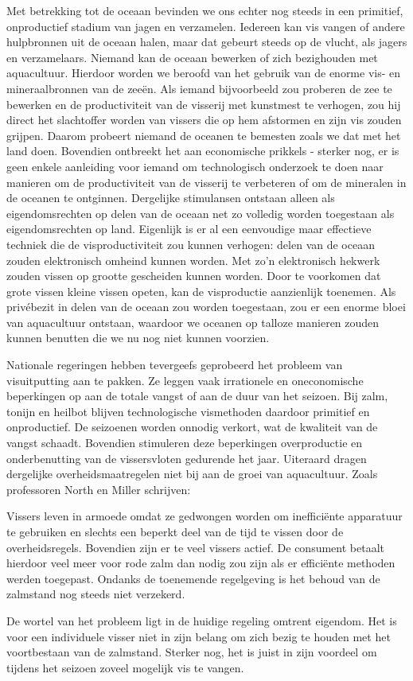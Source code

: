 \documentclass[
  a5paper,
  smalldemyvopaper,10pt,twoside,onecolumn,openright,extrafontsizes,hidelinks]{memoir}
\renewenvironment{quote}%
               {\list{}{\rightmargin=.6cm\leftmargin=.6cm}%
                \itshape \item[]}%
               {\endlist}
\begin{document}
Met betrekking tot de oceaan bevinden we ons echter nog steeds in een
primitief, onproductief stadium van jagen en verzamelen. Iedereen kan
vis vangen of andere hulpbronnen uit de oceaan halen, maar dat gebeurt
steeds op de vlucht, als jagers en verzamelaars. Niemand kan de oceaan
bewerken of zich bezighouden met aquacultuur. Hierdoor worden we beroofd
van het gebruik van de enorme vis- en mineraalbronnen van de zeeën. Als
iemand bijvoorbeeld zou proberen de zee te bewerken en de productiviteit
van de visserij met kunstmest te verhogen, zou hij direct het
slachtoffer worden van vissers die op hem afstormen en zijn vis zouden
grijpen. Daarom probeert niemand de oceanen te bemesten zoals we dat met
het land doen. Bovendien ontbreekt het aan economische prikkels -
sterker nog, er is geen enkele aanleiding voor iemand om technologisch
onderzoek te doen naar manieren om de productiviteit van de visserij te
verbeteren of om de mineralen in de oceanen te ontginnen. Dergelijke
stimulansen ontstaan alleen als eigendomsrechten op delen van de oceaan
net zo volledig worden toegestaan als eigendomsrechten op land.
Eigenlijk is er al een eenvoudige maar effectieve techniek die de
visproductiviteit zou kunnen verhogen: delen van de oceaan zouden
elektronisch omheind kunnen worden. Met zo'n elektronisch hekwerk zouden
vissen op grootte gescheiden kunnen worden. Door te voorkomen dat grote
vissen kleine vissen opeten, kan de visproductie aanzienlijk toenemen.
Als privébezit in delen van de oceaan zou worden toegestaan, zou er een
enorme bloei van aquacultuur ontstaan, waardoor we oceanen op talloze
manieren zouden kunnen benutten die we nu nog niet kunnen voorzien.

Nationale regeringen hebben tevergeefs geprobeerd het probleem van
visuitputting aan te pakken. Ze leggen vaak irrationele en oneconomische
beperkingen op aan de totale vangst of aan de duur van het seizoen. Bij
zalm, tonijn en heilbot blijven technologische vismethoden daardoor
primitief en onproductief. De seizoenen worden onnodig verkort, wat de
kwaliteit van de vangst schaadt. Bovendien stimuleren deze beperkingen
overproductie en onderbenutting van de vissersvloten gedurende het jaar.
Uiteraard dragen dergelijke overheidsmaatregelen niet bij aan de groei
van aquacultuur. Zoals professoren North en Miller schrijven:

\begin{quote}
Vissers leven in armoede omdat ze gedwongen worden om inefficiënte
apparatuur te gebruiken en slechts een beperkt deel van de tijd te
vissen door de overheidsregels. Bovendien zijn er te veel vissers
actief. De consument betaalt hierdoor veel meer voor rode zalm dan nodig
zou zijn als er efficiënte methoden werden toegepast. Ondanks de
toenemende regelgeving is het behoud van de zalmstand nog steeds niet
verzekerd.

De wortel van het probleem ligt in de huidige regeling omtrent eigendom.
Het is voor een individuele visser niet in zijn belang om zich bezig te
houden met het voortbestaan van de zalmstand. Sterker nog, het is juist
in zijn voordeel om tijdens het seizoen zoveel mogelijk vis te vangen.
\end{quote}
\end{document}
